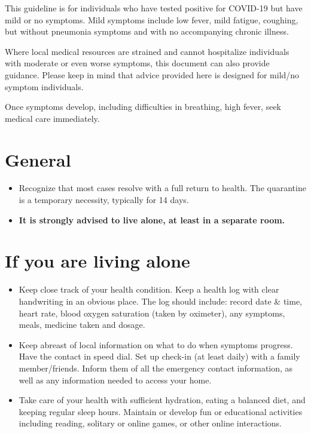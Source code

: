 \documentclass[onecolumn,journal]{IEEEtran}
\begin{document}
\begin{multicols}{2}
This guideline is for individuals who have tested positive for COVID-19 but have mild or no symptoms. Mild symptoms include low fever, mild fatigue, coughing, but without pneumonia symptoms and with no accompanying chronic illness. 

Where local medical resources are strained and cannot hospitalize individuals with moderate or even worse symptoms, this document can also provide guidance. Please keep in mind that advice provided here is designed for mild/no symptom individuals.

Once symptoms develop, including difficulties in breathing, high fever, seek medical care immediately.

\section*{General}
\begin{itemize}

\item Recognize that most cases resolve with a full return to health. The quarantine is a temporary necessity, typically for 14 days. 

\item \textbf{It is strongly advised to live alone, at least in a separate room.} 

\end{itemize}

\section*{If you are living alone}
\begin{itemize}

\item Keep close track of your health condition. Keep a health log with clear handwriting in an obvious place. The log should include: record date \& time, heart rate, blood oxygen saturation (taken by oximeter), any symptoms, meals, medicine taken and dosage.

\item Keep abreast of local information on what to do when symptoms progress. Have the contact in speed dial. Set up check-in (at least daily) with a family member/friends. Inform them of all the emergency contact information, as well as any information needed to access your home.

\item Take care of your health with sufficient hydration, eating a balanced diet, and keeping regular sleep hours. Maintain or develop fun or educational activities including reading, solitary or online games, or other online interactions. 


\end{itemize}
\end{multicols}
\end{document}
